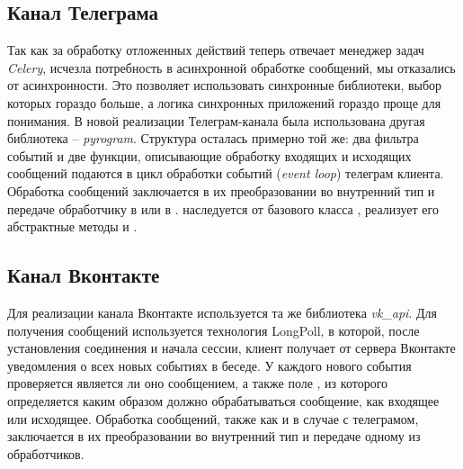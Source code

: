     \subsection{Канал Телеграма}
    Так как за обработку отложенных действий теперь отвечает менеджер задач \textit{Celery},
    исчезла потребность в асинхронной обработке сообщений, мы отказались от асинхронности.
    Это позволяет использовать синхронные библиотеки, выбор которых гораздо больше,
    а логика синхронных приложений гораздо проще для понимания.
    В новой реализации Телеграм-канала была использована другая библиотека -- \textit{pyrogram}.
    Структура  осталась примерно той же: два фильтра событий и две функции, описывающие
    обработку входящих и исходящих сообщений подаются в цикл обработки событий (\textit{event loop})
    телеграм клиента.
    Обработка сообщений заключается в их преобразовании во внутренний тип 
    и передаче обработчику в  или в .
     наследуется от базового класса ,
    реализует его абстрактные методы  и .

    \subsection{Канал Вконтакте}
    Для реализации канала Вконтакте используется та же библиотека \textit{vk\_api}. Для получения сообщений используется
    технология LongPoll, в которой, после установления соединения и начала сессии, клиент получает
    от сервера Вконтакте уведомления о всех новых событиях в беседе. У каждого нового события проверяется
    является ли оно сообщением, а также поле , из которого определяется каким образом
    должно обрабатываться сообщение, как входящее или исходящее.
    Обработка сообщений, также как и в случае с телеграмом, заключается в их преобразовании во внутренний тип
    и передаче одному из обработчиков.

